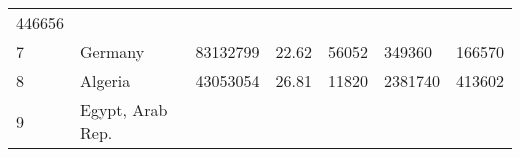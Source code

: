 \documentclass[
]{article}
\begin{document}
\begin{longtable}[]{@{}lllllll@{}}
\begin{minipage}[t]{0.12\columnwidth}
446656\strut
\end{minipage}\tabularnewline
\begin{minipage}[t]{0.06\columnwidth}\raggedright
7\strut
\end{minipage} & \begin{minipage}[t]{0.15\columnwidth}\raggedright
Germany\strut
\end{minipage} & \begin{minipage}[t]{0.13\columnwidth}\raggedright
83132799\strut
\end{minipage} & \begin{minipage}[t]{0.13\columnwidth}\raggedright
22.62\strut
\end{minipage} & \begin{minipage}[t]{0.09\columnwidth}\raggedright
56052\strut
\end{minipage} & \begin{minipage}[t]{0.12\columnwidth}\raggedright
349360\strut
\end{minipage} & \begin{minipage}[t]{0.12\columnwidth}\raggedright
166570\strut
\end{minipage}\tabularnewline
\begin{minipage}[t]{0.06\columnwidth}\raggedright
8\strut
\end{minipage} & \begin{minipage}[t]{0.15\columnwidth}\raggedright
Algeria\strut
\end{minipage} & \begin{minipage}[t]{0.13\columnwidth}\raggedright
43053054\strut
\end{minipage} & \begin{minipage}[t]{0.13\columnwidth}\raggedright
26.81\strut
\end{minipage} & \begin{minipage}[t]{0.09\columnwidth}\raggedright
11820\strut
\end{minipage} & \begin{minipage}[t]{0.12\columnwidth}\raggedright
2381740\strut
\end{minipage} & \begin{minipage}[t]{0.12\columnwidth}\raggedright
413602\strut
\end{minipage}\tabularnewline
\begin{minipage}[t]{0.06\columnwidth}\raggedright
9\strut
\end{minipage} & \begin{minipage}[t]{0.15\columnwidth}\raggedright
Egypt, Arab Rep.\strut

\end{minipage}
\end{longtable}
\end{document}
